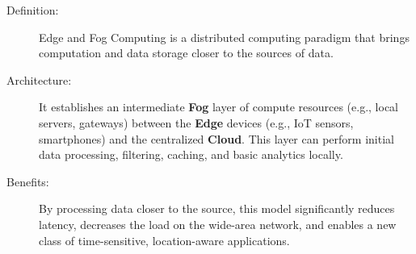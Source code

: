 \begin{description}
    \item[Definition:] Edge and Fog Computing is a distributed computing paradigm that brings computation and data storage closer to the sources of data.
    \item[Architecture:] It establishes an intermediate \textbf{Fog} layer of compute resources (e.g., local servers, gateways) between the \textbf{Edge} devices (e.g., IoT sensors, smartphones) and the centralized \textbf{Cloud}. This layer can perform initial data processing, filtering, caching, and basic analytics locally.
    \item[Benefits:] By processing data closer to the source, this model significantly reduces latency, decreases the load on the wide-area network, and enables a new class of time-sensitive, location-aware applications.
\end{description}

